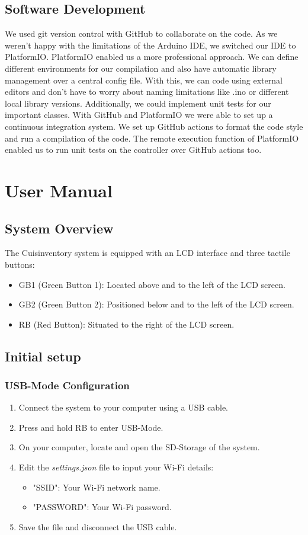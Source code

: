 \documentclass{article}
\begin{document}
\subsection{Software Development}
We used git version control with GitHub to collaborate on the code.
As we weren't happy with the limitations of the Arduino IDE, we switched our IDE to PlatformIO.
PlatformIO enabled us a more professional approach. We can define different environments for our compilation and also have automatic library management over a central config file.
With this, we can code using external editors and don't have to worry about naming limitations like .ino or different local library versions. Additionally, we could implement unit tests for our important classes.
With GitHub and PlatformIO we were able to set up a continuous integration system. We set up GitHub actions to format the code style and run a compilation of the code.
The remote execution function of PlatformIO enabled us to run unit tests on the controller over GitHub actions too.

\section{User Manual}
\subsection{System Overview}
The Cuisinventory system is equipped with an LCD interface and three tactile buttons:
\begin{itemize}
	\item GB1 (Green Button 1): Located above and to the left of the LCD screen.
	\item GB2 (Green Button 2): Positioned below and to the left of the LCD screen.
	\item RB (Red Button): Situated to the right of the LCD screen.
\end{itemize}

\subsection{Initial setup}
\subsubsection{USB-Mode Configuration}
\begin{enumerate}
	\item Connect the system to your computer using a USB cable.
	\item Press and hold RB to enter USB-Mode.
	\item On your computer, locate and open the SD-Storage of the system.
	\item Edit the \textit{settings.json} file to input your Wi-Fi details:
	      \begin{itemize}
		      \item "SSID": Your Wi-Fi network name.
		      \item "PASSWORD": Your Wi-Fi password.
	      \end{itemize}
	\item Save the file and disconnect the USB cable.
\end{enumerate}
\end{document}
